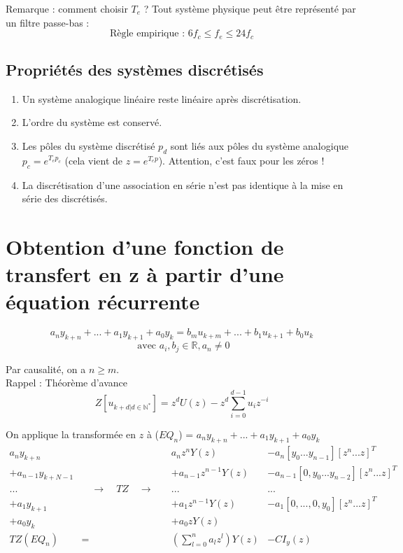 \documentclass[main.tex]{subfiles}
\begin{document}
\medskip
\noindent Remarque : comment choisir $T_e$ ? Tout système physique peut être représenté par un filtre passe-bas :
\[ \boxed{ \text{Règle empirique : } 6f_c \leq f_e \leq 24f_c } \]

\subsection*{Propriétés des systèmes discrétisés}

\begin{enumerate}
\item Un système analogique linéaire reste linéaire après discrétisation.
\item L'ordre du système est conservé.
\item Les pôles du système discrétisé $p_d$ sont liés aux pôles du système analogique $p_c = e^{T_e p_c}$ (cela vient de $z=e^{T_ep}$). Attention, c'est faux pour les zéros  !
\item La discrétisation d'une association en série n'est pas identique à la mise en série des discrétisés.
\end{enumerate}

\section{Obtention d'une fonction de transfert en z à partir d'une équation récurrente}

\[a_ny_{k+n} + ... + a_1y_{k+1}+a_0y_k = b_mu_{k+m} + ... + b_1u_{k+1} + b_0u_k \]
\[ \text{ avec } a_i,b_j \in \mathbb{R}, a_n \neq 0 \]

Par causalité, on a $n \geq m$. \\

Rappel : Théorème d'avance
\[ Z[u_{k+d|d\in\mathbb{N}^*}] = z^d U(z) - z^d \sum_{i=0}^{d-1}u_iz^{-i} \]

On applique la transformée en $z$ à ($EQ_n$) = $a_ny_{k+n} + ... + a_1y_{k+1}+a_0y_k$
\[
\begin{array}{lcll}
a_n y_{k+n} & & a_nz^nY(z) & - a_n [y_0...y_{n-1}][z^n...z]^T \\
+ a_{n-1} y_{k+N-1} & & + a_{n-1}z^{n-1}Y(z) & - a_{n-1} [0, y_0...y_{n-2}][z^n...z]^T  \\
... & \quad \rightarrow \quad TZ \quad \rightarrow \quad & ... & ... \\
+ a_1 y_{k+1} & & + a_1z^{n-1}Y(z) & - a_1 [0, ...,0,y_0][z^n...z]^T  \\
+ a_0 y_k & & +a_0zY(z) \\
\hline
TZ(EQ_n) & = & (\sum_{l=0}^na_lz^l)Y(z) & - CI_y(z)
\end{array}
\]
\end{document}
